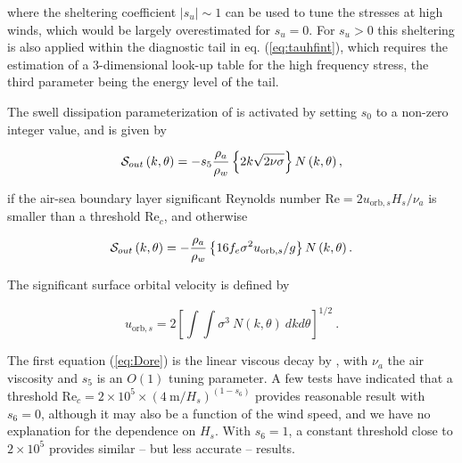 \noindent
where the sheltering coefficient $\left|s_u\right|\sim 1$ can be used to tune
the stresses at high winds, which would be largely overestimated for
$s_u=0$. For $s_u > 0$ this sheltering is also applied within the diagnostic
tail in eq. (\ref{eq:tauhfint}), which requires the estimation of a
3-dimensional look-up table for the high frequency stress, the third parameter
being the energy level of the tail.

The swell dissipation parameterization of \cite{art:ACC08} is activated by setting $s_0$ to a non-zero integer value, and is given
by

\begin{equation}
{\cal S}_{out}\left(k,\theta\right) = - s_5 \frac{\rho_a}{\rho_w}\left\{ 2 k \sqrt{2
\nu \sigma}\right\}  N \left(k,\theta\right) \label{Sds_turb},\label{eq:Dore}
\end{equation}

\noindent
if the air-sea boundary layer significant Reynolds number $\mathrm{Re} = 2
u_{\mathrm{orb},s} H_s / \nu_{a}$ is smaller than a threshold $\mathrm{Re}_c$, and otherwise

\begin{equation}
{\cal S}_{out} \left(k,\theta\right) = - \frac{\rho_a}{\rho_w}\left\{  16 f_e
\sigma^2 u_{\mathrm{orb},s} / g \right\}
 N\left(k,\theta\right) \label{Sds_visc}.\label{eq:swell_turb}
\end{equation}

\noindent
The significant surface orbital velocity is defined by

\begin{equation} u_{\mathrm{orb},s} = 2 \left [  \int \!\!\!\! \int
      \sigma^3 \: N(k,\theta) \: dk d\theta \right ] ^{1/2}
      \: . \label{eq:ub_orbs} \end{equation}

\noindent
The first equation (\ref{eq:Dore}) is the linear viscous decay by
\cite{art:Dore78}, with $\nu_a$ the air viscosity and $s_5$ is an $O(1)$
tuning parameter. A few tests have indicated that a threshold Re$_{c}=2 \times 10^5 \times (4~\mathrm{m}/H_s)^{(1-s_6)}$ provides reasonable result with 
$s_6=0$, although it may also be a function of the wind speed, and we have no explanation for the dependence on $H_s$. 
With $s_6=1$, a constant threshold close to $2 \times 10^5$ provides similar -- but less accurate -- results. 



